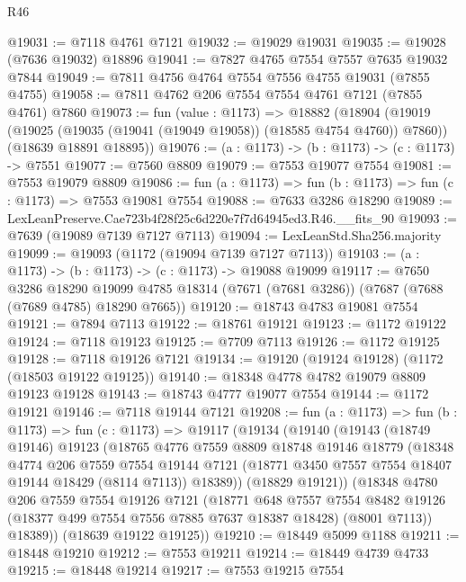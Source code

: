 \begin{lexlean}{R46}
\begin{coremodule}
@19031 := @7118 @4761 @7121
@19032 := @19029 @19031
@19035 := @19028 (@7636 @19032) @18896
@19041 := @7827 @4765 @7554 @7557 @7635 @19032 @7844
@19049 := @7811 @4756 @4764 @7554 @7556 @4755 @19031 (@7855 @4755)
@19058 := @7811 @4762 @206 @7554 @7554 @4761 @7121 (@7855 @4761) @7860
@19073 := fun (value : @1173) =>
  @18882
    (@18904
      (@19019 (@19025 (@19035 (@19041 (@19049 @19058)) (@18585 @4754 @4760)) @7860))
      (@18639 @18891 @18895))
@19076 := (a : @1173) -> (b : @1173) -> (c : @1173) -> @7551
@19077 := @7560 @8809
@19079 := @7553 @19077 @7554
@19081 := @7553 @19079 @8809
@19086 := fun (a : @1173) => fun (b : @1173) => fun (c : @1173) => @7553 @19081 @7554
@19088 := @7633 @3286 @18290
@19089 := LexLeanPreserve.Cae723b4f28f25c6d220e7f7d64945ed3.R46.__fits_90
@19093 := @7639 (@19089 @7139 @7127 @7113)
@19094 := LexLeanStd.Sha256.majority
@19099 := @19093 (@1172 (@19094 @7139 @7127 @7113))
@19103 := (a : @1173) -> (b : @1173) -> (c : @1173) -> @19088 @19099
@19117 := @7650
    @3286
    @18290
    @19099
    @4785
    @18314
    (@7671 (@7681 @3286))
    (@7687 (@7688 (@7689 @4785) @18290 @7665))
@19120 := @18743 @4783 @19081 @7554
@19121 := @7894 @7113
@19122 := @18761 @19121
@19123 := @1172 @19122
@19124 := @7118 @19123
@19125 := @7709 @7113
@19126 := @1172 @19125
@19128 := @7118 @19126 @7121
@19134 := @19120 (@19124 @19128) (@1172 (@18503 @19122 @19125))
@19140 := @18348 @4778 @4782 @19079 @8809 @19123 @19128
@19143 := @18743 @4777 @19077 @7554
@19144 := @1172 @19121
@19146 := @7118 @19144 @7121
@19208 := fun (a : @1173) =>
  fun (b : @1173) =>
  fun (c : @1173) =>
  @19117
    (@19134
      (@19140
        (@19143
          (@18749 @19146)
          @19123
          (@18765
            @4776
            @7559
            @8809
            @18748
            @19146
            @18779
            (@18348
              @4774
              @206
              @7559
              @7554
              @19144
              @7121
              (@18771 @3450 @7557 @7554 @18407 @19144 @18429 (@8114 @7113))
              @18389))
          (@18829 @19121))
        (@18348
          @4780
          @206
          @7559
          @7554
          @19126
          @7121
          (@18771
            @648
            @7557
            @7554
            @8482
            @19126
            (@18377 @499 @7554 @7556 @7885 @7637 @18387 @18428)
            (@8001 @7113))
          @18389))
      (@18639 @19122 @19125))
@19210 := @18449 @5099 @1188
@19211 := @18448 @19210
@19212 := @7553 @19211
@19214 := @18449 @4739 @4733
@19215 := @18448 @19214
@19217 := @7553 @19215 @7554

\end{coremodule}
\end{lexlean}
